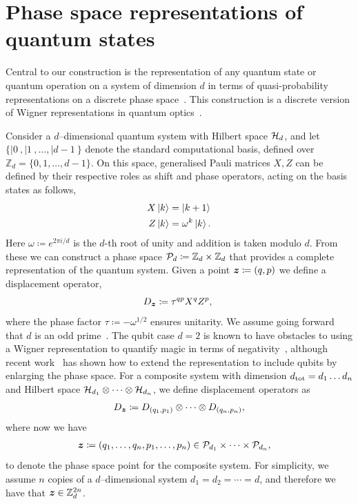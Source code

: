 \documentclass[pra,
aps,
twocolumn,
superscriptaddress,
groupedaddress,
nofootinbib,
reprint
]{revtex4-1}
\begin{document}
\section{Phase space representations of quantum states}
\label{sec:ps}

Central to our construction is the representation of any quantum state or quantum operation on a system of dimension $d$ in terms of quasi-probability representations on a discrete phase space~\cite{cit:gross3, Ferrie_2008}. This construction is a discrete version of Wigner representations in quantum optics~\cite{Wigner_1932, Vourdas_2004, Kenfack_2004}.

Consider a $d$--dimensional quantum system with Hilbert space $\H_d$, and let $\{ |0\>, |1\>, \dots , |d-1\>\}$ denote the standard computational basis, defined over $\mathbb{Z}_d = \{ 0, 1, \dots,d-1 \}$. On this space, generalised Pauli matrices $X, Z$ can be defined by their respective roles as shift and phase operators, acting on the basis states as follows,
\begin{align}
    X \ket{k} &= \ket{k + 1} \label{eq:xpauli}\\
	Z \ket{k} &= \omega^k \ket{k}. \label{eq:zpauli}
\end{align}
Here $\omega \coloneqq e^{2\pi i/d}$ is the $d$-th root of unity and addition is taken modulo $d$. From these we can construct a phase space $\cal{P}_d \coloneqq \mathbb{Z}_d \times \mathbb{Z}_d$ that provides a complete representation of the quantum system. Given a point $\bmz \coloneqq (q, p)$ we define a displacement operator, 
\begin{equation}\label{eq:ddef}
    D_{\bmz} \coloneqq \tau^{q p} X^{q} Z^{p},\ 
\end{equation}
where the phase factor $\tau \coloneqq -\omega^{1/2}$ ensures unitarity. We assume going forward that $d$ is an odd prime~\cite{Appleby_2005}. The qubit case $d=2$ is known to have obstacles to using a Wigner representation to quantify magic in terms of negativity~\cite{Mermin_1990, cit:howard2}, although recent work~\cite{Raussendorf_qubits} has shown how to extend the representation to include qubits by enlarging the phase space. For a composite system with dimension $d_{\rm tot} = d_1 \dots d_n$ and Hilbert space $\cal{H}_{d_1} \otimes \dots \otimes \cal{H}_{d_n}$, we define displacement operators as
\begin{equation}\label{eq:composited}
    D_{\bmz} \coloneqq D_{(q_1, p_1)} \otimes \dots \otimes D_{(q_n, p_n)},
\end{equation}
where now we have
\begin{align*}
	\bmz &\coloneqq (q_1, \dots, q_n, p_1, \dots, p_n) \in \cal{P}_{d_1} \times \dots \times \cal{P}_{d_n},
\end{align*}
to denote the phase space point for the composite system. 
For simplicity, we assume $n$ copies of a $d$--dimensional system $d_1=d_2 = \cdots = d$, and therefore we have that $\bmz \in \mathbb{Z}_d^{2n}$.
\end{document}
